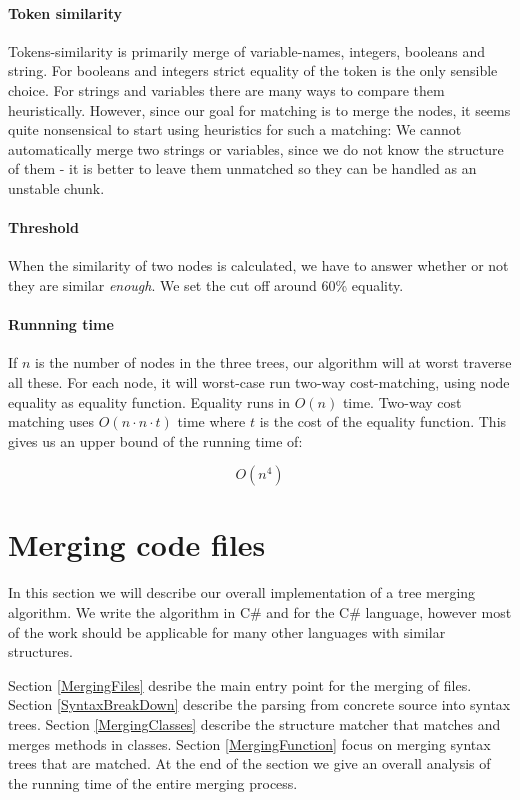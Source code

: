 \documentclass[11pt]{article}
\begin{document}
\paragraph{Token similarity} Tokens-similarity is primarily merge of variable-names, integers, booleans and string. For booleans and integers strict equality of the token is the only sensible choice. For strings and variables there are many ways to compare them heuristically. However, since our goal for matching is to merge the nodes, it seems quite nonsensical to start using heuristics for such a matching: We cannot automatically merge two strings or variables, since we do not know the structure of them - it is better to leave them unmatched so they can be handled as an unstable chunk.

\paragraph{Threshold} When the similarity of two nodes is calculated, we have to answer whether or not they are similar \textit{enough}. We set the cut off around 60\% equality.

\paragraph{Runnning time} If $n$ is the number of nodes in the three trees, our algorithm will at worst traverse all these. For each node, it will worst-case run two-way cost-matching, using node equality as equality function. Equality runs in $O(n)$ time. Two-way cost matching uses $O(n \cdot n \cdot t)$ time where $t$ is the cost of the equality function.   This gives us an upper bound of the running time of:

\begin{equation}
O(n^4) \nonumber
\end{equation}
\clearpage
\section{Merging code files}
In this section we will describe our overall implementation of a tree merging algorithm. We write the algorithm in C\# and for the C\# language, however most of the work should be applicable for many other languages with similar structures.

Section \ref{MergingFiles} desribe the main entry point for the merging of files. Section \ref{SyntaxBreakDown} describe the parsing from concrete source into syntax trees. Section \ref{MergingClasses} describe the structure matcher that matches and merges methods in classes. Section \ref{MergingFunction} focus on merging syntax trees that are matched. At the end of the section we give an overall analysis of the running time of the entire merging process.
\end{document}
